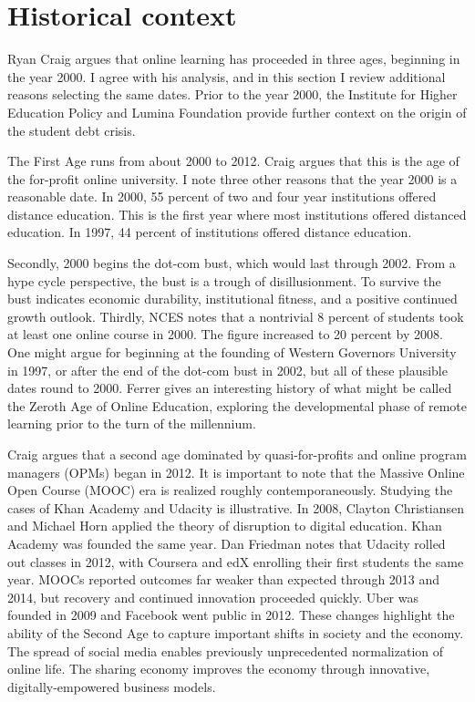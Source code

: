 \documentclass[review]{elsarticle}
\begin{document}
    \section{Historical context}

    Ryan Craig argues that online learning has proceeded in three ages, beginning in the year 2000.
    I agree with his analysis,
    and in this section I review additional reasons selecting the same dates.
    Prior to the year 2000,
    the Institute for Higher Education Policy and Lumina Foundation provide further context
    on the origin of the student debt crisis\cite{foundation_2017}.
    
    The First Age runs from about 2000 to 2012.
    Craig argues that this is the age of the for-profit online university.
    I note three other reasons that the year 2000 is a reasonable date.
    In 2000, 55 percent of two and four year institutions offered distance education\cite{tabs2003distance}.
    This is the first year where most institutions offered distanced education.
    In 1997, 44 percent of institutions offered distance education\cite{sikora2002profile}.

    Secondly, 2000 begins the dot-com bust, which would last through 2002\cite{wollscheid2012rise}.
    From a hype cycle perspective, the bust is a trough of disillusionment.
    To survive the bust indicates economic durability, institutional fitness, and a positive continued growth outlook.
    Thirdly, NCES notes that a nontrivial 8 percent of students took at least one online course in 2000\cite{radford2011learning}.
    The figure increased to 20 percent by 2008.
    One might argue for beginning at the founding of Western Governors University in 1997, or after the end of the dot-com bust in 2002, but all of these plausible dates round to 2000.
    Ferrer gives an interesting history of what might be called the Zeroth Age of Online Education, exploring the developmental phase of remote learning prior to the turn of the millennium\cite{ferrer_2019}.

    Craig argues that a second age dominated by quasi-for-profits and online program managers (OPMs) began in 2012.
    It is important to note that the Massive Online Open Course (MOOC) era is realized roughly contemporaneously.
    Studying the cases of Khan Academy and Udacity is illustrative.
    In 2008, Clayton Christiansen and Michael Horn applied the theory of disruption to digital education\cite{horn2008disrupting}.
    Khan Academy was founded the same year\cite{tucker_2018}.
    Dan Friedman\cite{friedman2014mooc} notes that Udacity rolled out classes in 2012, with Coursera and edX enrolling their first students the same year.
    MOOCs reported outcomes far weaker than expected through 2013 and 2014, but recovery and continued innovation proceeded quickly.
    Uber was founded in 2009 and Facebook went public in 2012.
    These changes highlight the ability of the Second Age to capture important shifts in society and the economy.
    The spread of social media enables previously unprecedented normalization of online life.
    The sharing economy improves the economy through innovative, digitally-empowered business models.
\end{document}
